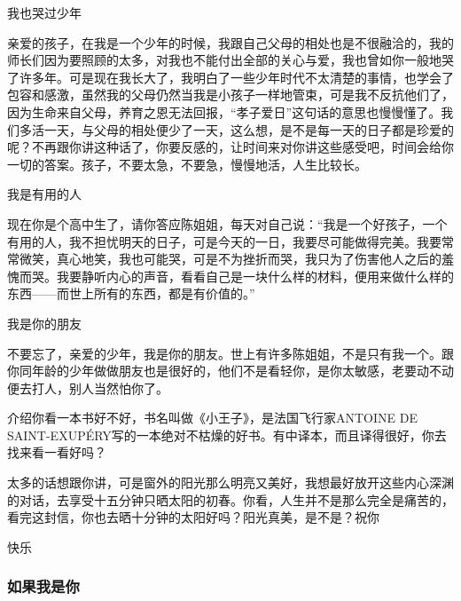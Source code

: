 \begin{center}
    \par 我也哭过少年
\end{center}
\par 亲爱的孩子，在我是一个少年的时候，我跟自己父母的相处也是不很融洽的，我的师长们因为要照顾的太多，对我也不能付出全部的关心与爱，我也曾如你一般地哭了许多年。可是现在我长大了，我明白了一些少年时代不太清楚的事情，也学会了包容和感激，虽然我的父母仍然当我是小孩子一样地管束，可是我不反抗他们了，因为生命来自父母，养育之恩无法回报，“孝子爱日”这句话的意思也慢慢懂了。我们多活一天，与父母的相处便少了一天，这么想，是不是每一天的日子都是珍爱的呢？不再跟你讲这种话了，你要反感的，让时间来对你讲这些感受吧，时间会给你一切的答案。孩子，不要太急，不要急，慢慢地活，人生比较长。
\begin{center}
    \par 我是有用的人
\end{center}
\par 现在你是个高中生了，请你答应陈姐姐，每天对自己说：“我是一个好孩子，一个有用的人，我不担忧明天的日子，可是今天的一日，我要尽可能做得完美。我要常常微笑，真心地笑，我也可能哭，可是不为挫折而哭，我只为了伤害他人之后的羞愧而哭。我要静听内心的声音，看看自己是一块什么样的材料，便用来做什么样的东西——而世上所有的东西，都是有价值的。”
\begin{center}
    \par 我是你的朋友
\end{center}
\par 不要忘了，亲爱的少年，我是你的朋友。世上有许多陈姐姐，不是只有我一个。跟你同年龄的少年做做朋友也是很好的，他们不是看轻你，是你太敏感，老要动不动便去打人，别人当然怕你了。
\par 介绍你看一本书好不好，书名叫做《小王子》，是法国飞行家ANTOINE DE SAINT-EXUPÉRY写的一本绝对不枯燥的好书。有中译本，而且译得很好，你去找来看一看好吗？
\par 太多的话想跟你讲，可是窗外的阳光那么明亮又美好，我想最好放开这些内心深渊的对话，去享受十五分钟只晒太阳的初春。你看，人生并不是那么完全是痛苦的，看完这封信，你也去晒十分钟的太阳好吗？阳光真美，是不是？祝你
\par 快乐
\par {}


\subsubsection{如果我是你}


